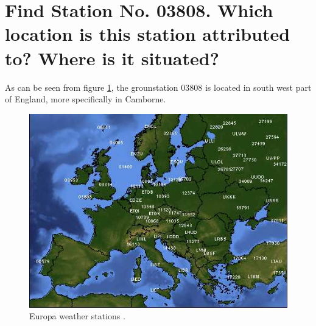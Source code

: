 \documentclass{article}
\begin{document}



\newpage				%
\renewcommand{\contentsname}{Table of Contents}
\tableofcontents		%


\newpage
\section{Find Station No. 03808. Which location is this station attributed to? Where is it situated?}
As can be seen from figure \ref{fig:1}, the grounstation 03808 is located in south west part of England, more specifically in Camborne. 

\begin{figure}[H]
	\centering
 	\includegraphics[width=1\textwidth]{figures/europe.jpg}
 	\caption{Europa weather stations \cite{assignment}.}
 	\label{fig:1}
\end{figure}


\end{document}
